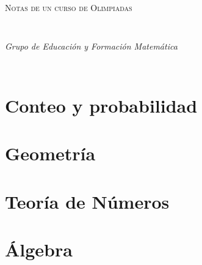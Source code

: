 \documentclass[letterpaper,11pt,oneside]{book}
\theoremstyle{definition}
\theoremstyle{remark}
\begin{document}
\begin{titlepage}
\begin{center}
\begin{Huge}
\textsc{Notas de un curso de Olimpiadas}
\end{Huge}
\end{center}
\end{titlepage}

\newpage
$\ $
\thispagestyle{empty} %

\chapter*{}
\begin{flushright}
\textit{Grupo de Educación y Formación Matemática}
\end{flushright}

\newpage
$\ $
\thispagestyle{empty}


\tableofcontents

\newpage
$\ $
\thispagestyle{empty} %

 
\part{Conteo y probabilidad}\label{cap.conteo y probabilidad}
	

\part{Geometría}\label{capGeometria}
		
	

\part{Teoría de Números}
	
	
\part{Álgebra}\label{algebra}
	
	
\end{document}
